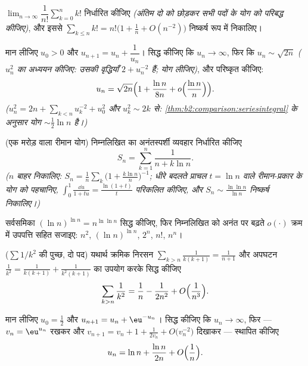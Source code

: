 \begin{exercise}[$\star\star$]\label{exo:b2:comparison:7}
$\lim_{n\to\infty} \dfrac{1}{n!}\sum_{k=0}^{n} k!$ निर्धारित कीजिए \emph{(अंतिम दो को छोड़कर सभी पदों के योग को परिबद्ध
कीजिए)}, और इससे  $\sum_{k \leq n} k! = n!\bigl(1 + \frac1n +
O(n^{-2})\bigr)$ निष्कर्ष रूप में निकालिए।
\end{exercise}

\begin{exercise}[$\star\star\star$]\label{exo:b2:comparison:8}
मान लीजिए $u_0 > 0$ और $u_{n+1} = u_n + \dfrac{1}{u_n}$। सिद्ध कीजिए कि $u_n
\to \infty$, फिर कि $u_n \sim \sqrt{2n}$ \emph{($u_n^2$ का
अध्ययन कीजिए: उसकी वृद्धियाँ $2 + u_n^{-2}$ हैं; योग लीजिए)}, और परिष्कृत कीजिए:
\[
u_n = \sqrt{2n}\Bigl(1 + \frac{\ln n}{8n} +
o\Bigl(\frac{\ln n}{n}\Bigr)\Bigr).
\]
\emph{($u_n^2 = 2n + \sum_{k<n} u_k^{-2} + u_0^2$ और $u_k^2
\sim 2k$ से: \cref{thm:b2:comparison:seriesintegral} के अनुसार योग $\sim \frac12\ln n$ है।)}
\end{exercise}

\begin{exercise}[$\star\star\star$]\label{exo:b2:comparison:9}
(एक मरोड़ वाला रीमान योग) निम्नलिखित का अनंतस्पर्शी व्यवहार निर्धारित
कीजिए
\[
S_n = \sum_{k=1}^{n} \frac{1}{n + k\ln n} .
\]
\emph{($n$ बाहर निकालिए: $S_n = \frac1n\sum_k \bigl(1 +
\frac{k\ln n}{n}\bigr)^{-1}$; धीरे बदलते प्राचल $t = \ln n$ वाले रीमान-प्रकार के
योग को पहचानिए, $\int_0^1
\frac{\dd u}{1 + tu} = \frac{\ln(1+t)}{t}$ परिकलित कीजिए, और $S_n \sim
\frac{\ln\ln n}{\ln n}$ निष्कर्ष निकालिए।)}
\end{exercise}

\begin{exercise}[$\star$]\label{exo:b2:comparison:10}
सर्वसमिका $(\ln n)^{\ln n} = n^{\ln\ln n}$ सिद्ध कीजिए, फिर निम्नलिखित को अनंत पर बढ़ते $o(\cdot)$ क्रम में
उपपत्ति सहित सजाइए: $n^2$, $(\ln n)^{\ln n}$, $2^n$, $n!$, $n^n$।
\end{exercise}

\begin{exercise}[$\star\star$]\label{exo:b2:comparison:11}
($\sum 1/k^2$ की पुच्छ, दो पद) यथार्थ क्रमिक निरसन $\sum_{k > n} \frac{1}{k(k+1)} = \frac{1}{n+1}$ और अपघटन $\frac1{k^2} = \frac{1}{k(k+1)} +
\frac{1}{k^2(k+1)}$ का उपयोग
करके सिद्ध कीजिए
\[
\sum_{k > n} \frac{1}{k^2}
= \frac1n - \frac{1}{2n^2} + O\Bigl(\frac{1}{n^3}\Bigr).
\]
\end{exercise}

\begin{exercise}[$\star\star\star$]\label{exo:b2:comparison:12}
मान लीजिए $u_0 = \frac12$ और $u_{n+1} = u_n + \eu^{-u_n}$। सिद्ध कीजिए कि $u_n \to \infty$, फिर --- $v_n = \eu^{u_n}$ रखकर और $v_{n+1} = v_n + 1 + \frac{1}{2v_n} + O\bigl(v_n^{-2}\bigr)$
दिखाकर --- स्थापित कीजिए
\[
u_n = \ln n + \frac{\ln n}{2n} + O\Bigl(\frac1n\Bigr).
\]
\end{exercise}

